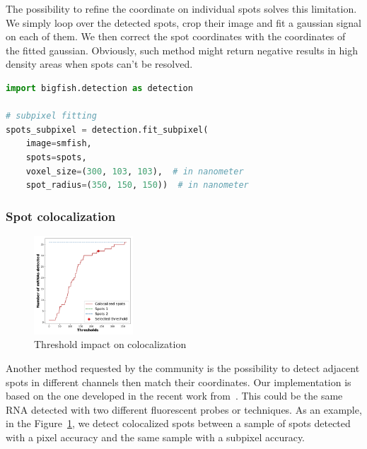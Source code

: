 The possibility to refine the coordinate on individual spots solves this limitation.
We simply loop over the detected spots, crop their image and fit a gaussian signal on each of them.
We then correct the spot coordinates with the coordinates of the fitted gaussian.
Obviously, such method might return negative results in high density areas when spots can't be resolved.\\

\begin{minipage}{0.9\textwidth}
\begin{lstlisting}[language=Python]
import bigfish.detection as detection

# subpixel fitting
spots_subpixel = detection.fit_subpixel(
    image=smfish,
    spots=spots,
    voxel_size=(300, 103, 103),  # in nanometer
    spot_radius=(350, 150, 150))  # in nanometer
\end{lstlisting}
\end{minipage}

\subsubsection{Spot colocalization}

\begin{figure}
	\begin{center}
		\includegraphics[width=0.33\textwidth]{figures/chapter2/colocalization_elbow}
	\caption{Threshold impact on colocalization}
	\label{fig:elbow_colocalization}
	\end{center}
\end{figure}

Another method requested by the community is the possibility to detect adjacent spots in different channels then match their coordinates.
Our implementation is based on the one developed in the recent work from~\cite{CORNES_2022}.
This could be the same \ac{RNA} detected with two different fluorescent probes or techniques.
As an example, in the Figure~\ref{fig:elbow_colocalization}, we detect colocalized spots between a sample of spots detected with a pixel accuracy and the same sample with a subpixel accuracy.

